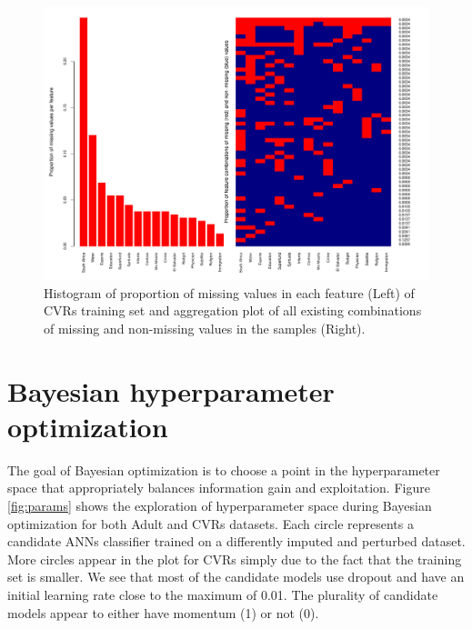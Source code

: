 \documentclass[10pt]{book}
\theoremstyle{definition}
\begin{document}
\begin{figure}[h!]
\includegraphics [scale=0.75, center]{figure/proportion-missing-votes}\par
\caption{\footnotesize Histogram of proportion of missing values in each feature (Left) of CVRs training set and aggregation plot of all existing combinations of missing and non-missing values in the samples (Right).}
 \label{fig:proportion-missing-votes}
\end{figure}

\clearpage
\section{Bayesian hyperparameter optimization}
\setcounter{equation}{0}

The goal of Bayesian optimization is to choose a point in the hyperparameter space that appropriately balances information gain and exploitation. Figure \ref{fig:params} shows the exploration of hyperparameter space during Bayesian optimization for both Adult and CVRs datasets. Each circle represents a candidate ANNs classifier trained on a differently imputed and perturbed dataset. More circles appear in the plot for CVRs simply due to the fact that the training set is smaller. We see that most of the candidate models use dropout and have an initial learning rate close to the maximum of 0.01. The plurality of candidate models appear to either have momentum (1) or not (0).
\end{document}

